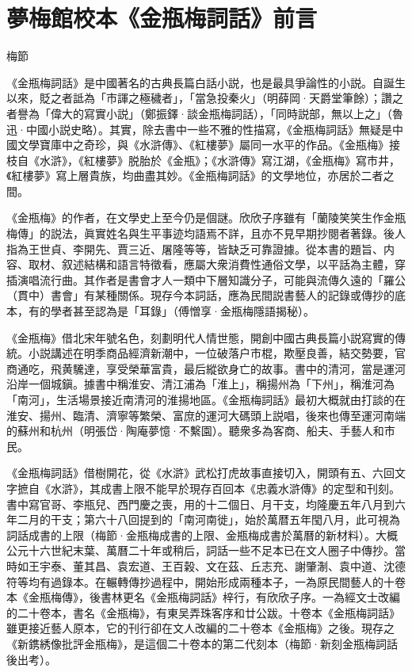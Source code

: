 \chapter*{夢梅館校本《金瓶梅詞話》前言}

\begin{declareqianyan}
梅節\qquad\ 
\end{declareqianyan}

《金瓶梅詞話》是中國著名的古典長篇白話小説，也是最具爭論性的小説。自誕生以來，貶之者詆為「市諢之極穢者」，「當急投秦火」{\innerzhushi（明薛岡·天爵堂筆餘）}；讚之者譽為「偉大的寫實小説」{\innerzhushi（鄭振鐸·談金瓶梅詞話）}，「同時説部，無以上之」{\innerzhushi（魯迅·中國小説史略）}。其實，除去書中一些不雅的性描寫，《金瓶梅詞話》無疑是中國文學寶庫中之奇珍，與《水滸傳》、《紅樓夢》屬同一水平的作品。《金瓶梅》接枝自《水滸》，《紅樓夢》脱胎於《金瓶》；《水滸傳》寫江湖，《金瓶梅》寫市井，《紅樓夢》寫上層貴族，均曲盡其妙。《金瓶梅詞話》的文學地位，亦居於二者之間。

《金瓶梅》的作者，在文學史上至今仍是個謎。欣欣子序雖有「蘭陵笑笑生作金瓶梅傳」的説法，眞實姓名與生平事迹均語焉不詳，且亦不見早期抄閱者著錄。後人指為王世貞、李開先、賈三近、屠隆等等，皆缺乏可靠證據。從本書的題旨、内容、取材、叙述結構和語言特徵看，應屬大衆消費性通俗文學，以平話為主體，穿插演唱流行曲。其作者是書會才人一類中下層知識分子，可能與流傳久遠的「羅公（貫中）書會」有某種關係。現存今本詞話，應為民間説書藝人的記錄或傳抄的底本，有的學者甚至認為是「耳錄」{\innerzhushi（傅憎享·金瓶梅隱語揭秘）}。

《金瓶梅》借北宋年號名色，刻劃明代人情世態，開創中國古典長篇小説寫實的傳統。小説講述在明季商品經濟新潮中，一位破落户市棍，欺壓良善，結交勢要，官商通吃，飛黄驣達，享受榮華富貴，最后縱欲身亡的故事。書中的清河，當是運河沿岸一個城鎭。據書中稱淮安、清江浦為「淮上」，稱揚州為「下州」，稱淮河為「南河」，生活場景接近南清河的淮揚地區。《金瓶梅詞話》最初大概就由打談的在淮安、揚州、臨清、濟寧等繁榮、富庶的運河大碼頭上説唱，後來也傳至運河南端的蘇州和杭州{\innerzhushi（明張岱·陶庵夢憶·不繫園）}。聽衆多為客商、船夫、手藝人和市民。

《金瓶梅詞話》借樹開花，從《水滸》武松打虎故事直接切入，開頭有五、六回文字摭自《水滸》，其成書上限不能早於現存百回本《忠義水滸傳》的定型和刊刻。書中寫官哥、李瓶兒、西門慶之喪，用的十二個日、月干支，均隆慶五年八月到六年二月的干支；第六十八回提到的「南河南徙」，始於萬暦五年閠八月，此可視為詞話成書的上限{\innerzhushi（梅節·金瓶梅成書的上限、金瓶梅成書於萬曆的新材料）}。大概公元十六世紀末葉、萬曆二十年或稍后，詞話一些不足本已在文人圈子中傳抄。當時如王宇泰、董其昌、袁宏道、王百榖、文在茲、丘志充、謝肇淛、袁中道、沈德符等均有過錄本。在輾轉傳抄過程中，開始形成兩種本子，一為原民間藝人的十卷本《金瓶梅傳》，後書林更名《金瓶梅詞話》梓行，有欣欣子序。一為經文士改編的二十卷本，書名《金瓶梅》，有東吴弄珠客序和廿公跋。十卷本《金瓶梅詞話》雖更接近藝人原本，它的刊行卻在文人改編的二十卷本《金瓶梅》之後。現存之《新鎸綉像批評金瓶梅》，是這個二十卷本的第二代刻本{\innerzhushi（梅節·新刻金瓶梅詞話後出考）}。

